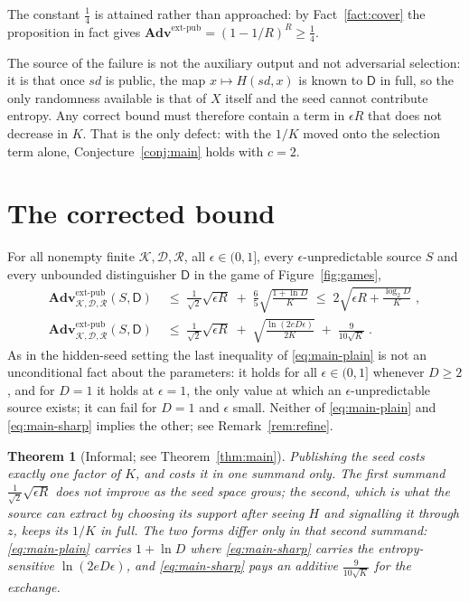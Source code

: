 \documentclass{conjura-solution}
\newcommand{\Adv}{\mathbf{Adv}}
\newcommand{\extp}{\mathrm{ext}\text{-}\mathrm{pub}}
\newcommand{\sd}{\mathit{sd}}
\newcommand{\calK}{\mathcal{K}}
\newcommand{\calD}{\mathcal{D}}
\newcommand{\calR}{\mathcal{R}}
\theoremstyle{cjplain}
\newtheorem*{theoremstar}{Theorem}
\begin{document}
The constant $\tfrac14$ is attained rather than approached: by Fact~\ref{fact:cover} the
proposition in fact gives
$\Adv^{\extp} = (1-1/R)^{R} \ge \tfrac14$.

The source of the failure is not the auxiliary output and not adversarial selection: it is that
once $\sd$ is public, the map $x \mapsto H(\sd,x)$ is known to $\mathsf{D}$ in full, so the only
randomness available is that of $X$ itself and the seed cannot contribute entropy. Any correct
bound must therefore contain a term in $\epsilon R$ that does not decrease in $K$. That is the
only defect: with the $1/K$ moved onto the selection term alone, Conjecture~\ref{conj:main} holds
with $c = 2$.

\section{The corrected bound}\label{sec:corrected}

\begin{theorem}\label{thm:main}
For all nonempty finite $\calK, \calD, \calR$, all $\epsilon \in (0,1]$, every $\epsilon$-unpredictable
source $S$ and every unbounded distinguisher $\mathsf{D}$ in the game of Figure~\ref{fig:games},
\begin{align}
  \Adv^{\extp}_{\calK,\calD,\calR}(S,\mathsf{D})
  &\;\le\; \frac{1}{\sqrt{2}}\sqrt{\epsilon R}
        \;+\; \frac{6}{5}\sqrt{\frac{1 + \ln D}{K}}
  \;\le\; 2\sqrt{\epsilon R + \frac{\log_2 D}{K}} \; ,
  \label{eq:main-plain}\\[2pt]
  \Adv^{\extp}_{\calK,\calD,\calR}(S,\mathsf{D})
  &\;\le\; \frac{1}{\sqrt{2}}\sqrt{\epsilon R}
        \;+\; \sqrt{\frac{\ln(2eD\epsilon)}{2K}} \;+\; \frac{9}{10\sqrt{K}} \; .
  \label{eq:main-sharp}
\end{align}
As in the hidden-seed setting the last inequality of \eqref{eq:main-plain} is not an unconditional
fact about the parameters: it holds for all $\epsilon \in (0,1]$ whenever $D \ge 2$, and for
$D = 1$ it holds at $\epsilon = 1$, the only value at which an $\epsilon$-unpredictable source
exists; it can fail for $D = 1$ and $\epsilon$ small. Neither of
\eqref{eq:main-plain} and \eqref{eq:main-sharp} implies the other; see Remark~\ref{rem:refine}.
\end{theorem}

\begin{theoremstar}[Informal; see Theorem~\ref{thm:main}]
Publishing the seed costs exactly one factor of $K$, and costs it in one summand only. The first
summand $\tfrac{1}{\sqrt{2}}\sqrt{\epsilon R}$ does not improve as the seed space grows; the
second, which is what the source can extract by choosing its support after seeing $H$ and signalling
it through $z$, keeps its $1/K$ in full. The two forms differ only in that second summand:
\eqref{eq:main-plain} carries $1 + \ln D$ where \eqref{eq:main-sharp} carries the
entropy-sensitive $\ln(2eD\epsilon)$, and \eqref{eq:main-sharp} pays an additive
$\tfrac{9}{10\sqrt{K}}$ for the exchange.
\end{theoremstar}
\end{document}
